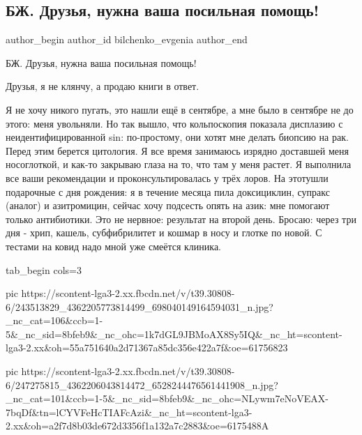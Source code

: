  
 
 
 
 
 
\subsection{БЖ. Друзья, нужна ваша посильная помощь!}
\label{sec:20_10_2021.fb.bilchenko_evgenia.4.prosjba_pomosch}
 
\ifcmt
 author_begin
   author_id bilchenko_evgenia
 author_end
\fi

БЖ. Друзья, нужна ваша посильная помощь!

Друзья, я не клянчу, а продаю книги в ответ.

Я не хочу никого пугать, это нашли ещё в сентябре, а мне было в сентябре не до
этого: меня увольняли. Но так вышло, что кольпоскопия показала дисплазию с
неидентифицированной sin: по-простому, они хотят мне делать биопсию на рак.
Перед этим берется цитология. Я все время занимаюсь изрядно доставшей меня
носоглоткой, и как-то закрываю глаза на то, что там у меня растет. Я выполнила
все ваши рекомендации и проконсультировалась у трёх лоров. На этотушли
подарочные с дня рождения: я в течение месяца пила доксициклин, супракс
(аналог) и азитромицин, сейчас хочу подсесть опять на азик: мне помогают только
антибиотики. Это не нервное: результат на второй день. Бросаю: через три дня -
хрип, кашель, субфибрилитет и кошмар в носу и глотке по новой. С тестами на
ковид надо мной уже смеётся клиника. 

\ifcmt
  tab_begin cols=3

     pic https://scontent-lga3-2.xx.fbcdn.net/v/t39.30808-6/243513829_4362205773814499_698040149164594031_n.jpg?_nc_cat=106&ccb=1-5&_nc_sid=8bfeb9&_nc_ohc=1k7dGL9JBMoAX8Sy5IQ&_nc_ht=scontent-lga3-2.xx&oh=55a751640a2d71367a85dc356e422a7f&oe=61756823

     pic https://scontent-lga3-2.xx.fbcdn.net/v/t39.30808-6/247275815_4362206043814472_6528244476561441908_n.jpg?_nc_cat=101&ccb=1-5&_nc_sid=8bfeb9&_nc_ohc=NLywm7eNoVEAX-7bqDf&tn=lCYVFeHcTIAFcAzi&_nc_ht=scontent-lga3-2.xx&oh=a2f7d8b03de672d3356f1a132a7c2883&oe=6175488A

